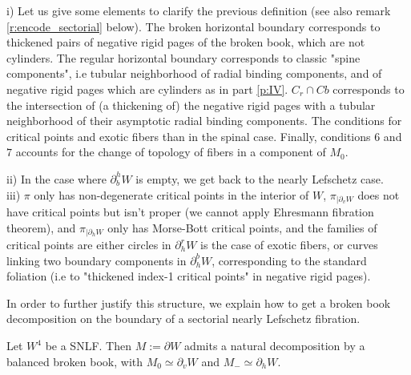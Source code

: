 \documentclass[../main.tex]{subfiles}
\begin{document}
\begin{remark}
i) Let us give some elements to clarify the previous definition (see also remark \ref{r:encode_sectorial} below). The broken horizontal boundary corresponds to thickened pairs of negative rigid pages of the broken book, which are not cylinders. The regular horizontal boundary corresponds to classic "spine components", i.e tubular neighborhood of radial binding components, and of negative rigid pages which are cylinders as in part \ref{p:IV}. $C_r\cap Cb$ corresponds to the intersection of (a thickening of) the negative rigid pages with a tubular neighborhood of their asymptotic radial binding components. The conditions for critical points and exotic fibers than in the spinal case. Finally, conditions $6$ and $7$ accounts for the change of topology of fibers in a component of $M_0$.

ii) In the case where $\partial_b^hW$ is empty, we get back to the nearly Lefschetz case. \\

iii) $\pi$ only has non-degenerate critical points in the interior of $W$, $\pi_{|\partial_v W}$ does not have critical points but isn't proper (we cannot apply Ehresmann fibration theorem), and $\pi_{|\partial_h W}$ only has Morse-Bott critical points, and the families of critical points are either circles in $\partial_h^rW$ is the case of exotic fibers, or curves linking two boundary components in $\partial_h^bW$, corresponding to the standard foliation (i.e to "thickened index-1 critical points" in negative rigid pages).
\end{remark}

In order to further justify this structure, we explain how to get a broken book decomposition on the boundary of a sectorial nearly Lefschetz fibration.

\begin{lemma}
Let $W^4$ be a SNLF. Then $M:= \partial W$ admits a natural decomposition by a balanced broken book, with $M_0\simeq \partial_vW$ and $M_- \simeq \partial_hW$. 
\end{lemma}
\end{document}
